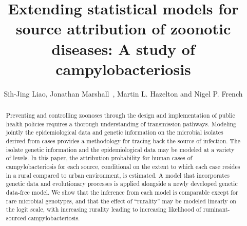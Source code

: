 \documentclass[times, doublespace]{simauth}%
\begin{document}
\title{Extending statistical models for source attribution of zoonotic diseases: A study of campylobacteriosis} 
\author{Sih-Jing Liao,
Jonathan Marshall\corrauth\ \footnotemark[2], Martin L. Hazelton and Nigel P. French}
\address{ Institute of Fundamental Sciences-Statistics, Massey University, Palmerston North, New Zealand\\
 mEpiLab, Hopkirk Research Institute, Massey University, Palmerston North, New Zealand}

\begin{abstract}

Preventing and controlling zoonoses through the design and implementation of public health policies requires a thorough understanding of transmission pathways. Modeling jointly the epidemiological data and genetic information on the microbial isolates derived from cases provides a methodology for tracing back the source of infection. The isolate genetic information and the epidemiological data may be modeled at a variety of levels. In this paper, the attribution probability for human cases of campylobacteriosis for each source, conditional on the extent to which each case resides in a rural compared to urban environment, is estimated. A model that incorporates genetic data and evolutionary processes is applied alongside a newly developed genetic data-free model. We show that the inference from each model is comparable except for rare microbial genotypes, and that the effect of ``rurality'' may be modeled linearly on the logit scale, with increasing rurality leading to increasing likelihood of ruminant-sourced campylobacteriosis.

\end{abstract}

\maketitle
\end{document}
